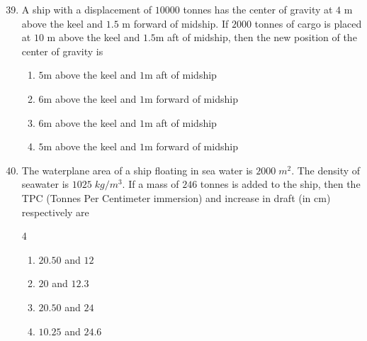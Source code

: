 \documentclass[journal]{IEEEtran}
\theoremstyle{remark}
\begin{document}
\begin{enumerate}[itemsep=1em]
\setcounter{enumi}{38}
\item A ship with a displacement of $10000$ tonnes has the center of gravity at $4$ m above the keel and $1.5$ m forward of midship. If $2000$ tonnes of cargo is placed at $10$ m 
above the keel and $1.5$m aft of midship, then the new position of the center of gravity is

\begin{enumerate}[label=\Alph*), leftmargin=2.5em, labelsep=0.5em, itemsep=0.5em]
       \item $5$m above the keel and $1$m aft of midship 
       \item $6$m above the keel and $1$m forward of midship 
       \item $6$m above the keel and $1$m aft of midship  
       \item $5$m above the keel and $1$m forward of midship 
\end{enumerate}
\end{enumerate}

\begin{enumerate}[itemsep=1em]
\setcounter{enumi}{39}
\item The waterplane area of a ship floating in sea water is $2000\;m^2$. The density of seawater is $1025\;kg/m^3$. If a mass of $246$ tonnes is added to the ship, then the TPC 
(Tonnes Per Centimeter immersion) and increase in draft (in cm) respectively are 
\begin{multicols}{4}
\begin{enumerate}[label=\Alph*)]
       \item $20.50$ and $12$
       \item $20$ and $12.3$
       \item $20.50$ and $24$  
       \item $10.25$ and $24.6$ 
\end{enumerate}
\end{multicols}

\end{enumerate}

\newpage
\vspace*{0.25cm}
\end{document}
